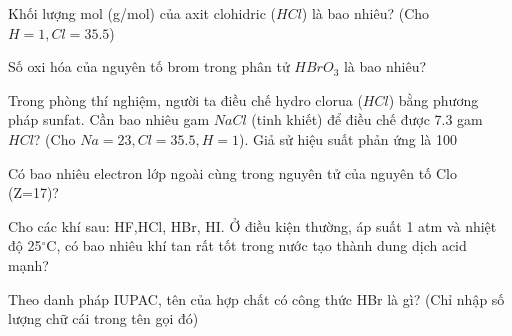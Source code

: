 \documentclass[Main.tex]{subfiles}
\begin{document}
    \begin{bt}
        Khối lượng mol (g/mol) của axit clohidric ($HCl$) là bao nhiêu? (Cho $H=1, Cl=35.5$)
    \end{bt}
    
    \begin{bt}
        Số oxi hóa của nguyên tố brom trong phân tử $HBrO_3$ là bao nhiêu?
    \end{bt}
    
    \begin{bt}
        Trong phòng thí nghiệm, người ta điều chế hydro clorua ($HCl$) bằng phương pháp sunfat. Cần bao nhiêu gam $NaCl$ (tinh khiết) để điều chế được 7.3 gam $HCl$? (Cho $Na=23, Cl=35.5, H=1$). Giả sử hiệu suất phản ứng là 100%
    \end{bt}
    
    \begin{bt}
        Có bao nhiêu electron lớp ngoài cùng trong nguyên tử của nguyên tố Clo (Z=17)?
    \end{bt}
\begin{bt}
    Cho các khí sau: HF,HCl, HBr, HI. Ở điều kiện thường, áp suất 1 atm và nhiệt độ 25$^\circ$C, có bao nhiêu khí tan rất tốt trong nước tạo thành dung dịch acid mạnh?
    \end{bt}
    
    
    
    \begin{bt}
    Theo danh pháp IUPAC, tên của hợp chất có công thức HBr là gì? (Chỉ nhập số lượng chữ cái trong tên gọi đó)
    \end{bt}
    
\end{document}
